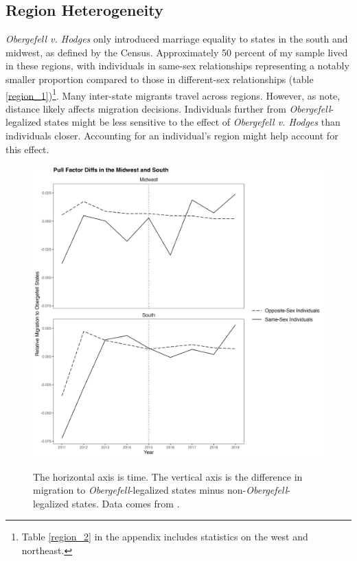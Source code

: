 \documentclass[12pt,letterpaper]{article}
\begin{document}
\FloatBarrier
\subsection{Region Heterogeneity}



\textit{Obergefell v. Hodges} only introduced marriage equality to states in the south and midwest, as defined by the Census. Approximately 50 percent of my sample lived in these regions, with individuals in same-sex relationships representing a notably smaller proportion compared to those in different-sex relationships (table \ref{region_1})\footnote{Table \ref{region_2} in the appendix includes statistics on the west and northeast.}. Many inter-state migrants travel across regions. However, as \citet{1} note, distance likely affects migration decisions. Individuals further from \textit{Obergefell}-legalized states might be less sensitive to the effect of \textit{Obergefell v. Hodges} than individuals closer. Accounting for an individual’s region might help account for this effect.
\FloatBarrier
\begin{figure}[htbp]
    \centering
    \caption{}
    \label{fig: region_post_diffs}
    \includegraphics[width=.75\linewidth]{outputs/summary_stats/region_post_diffs.png}

    \vspace{0.5em}
    \begin{minipage}{0.75\linewidth}
        \footnotesize The horizontal axis is time. The vertical axis is the difference in migration to \textit{Obergefell}-legalized states minus non-\textit{Obergefell}-legalized states. Data comes from \citet{28}.
    \end{minipage}
\end{figure}
\end{document}
